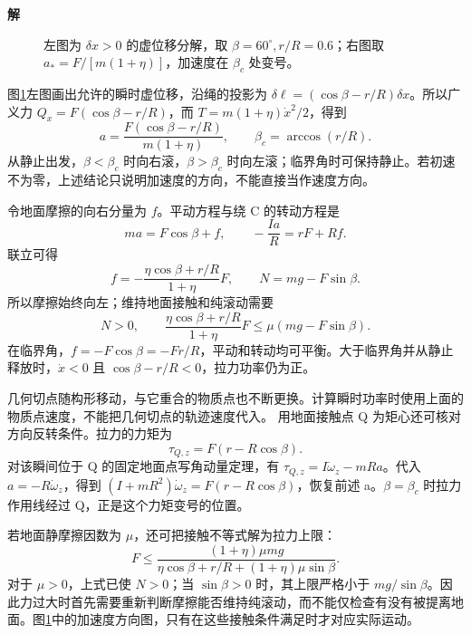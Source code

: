 \documentclass[11pt,openany,fontset=fandol]{ctexbook}
\theoremstyle{definition}\newtheorem{example}{例}[chapter]\newtheorem{exercise}{习题}[chapter]
\newcommand{\SolutionStart}{\par\medskip\ifdim\pagetotal>0pt\ifdim\dimexpr\pagegoal-\pagetotal\relax<3\baselineskip\newpage\fi\fi\noindent\textbf{解}\quad\ignorespaces}
\newenvironment{solution}{\SolutionStart}{\par\medskip}
\begin{document}
\begin{solution}
\begin{figure}[H]
\caption{左图为 $\delta x>0$ 的虚位移分解，取 $\beta=60^\circ,r/R=0.6$；右图取 $a_*=F/[m(1+\eta)]$，加速度在 $\beta_c$ 处变号。}\label{mp5:fig:l5-h12-s}
\end{figure}

图\ref{mp5:fig:l5-h12-s}左图画出允许的瞬时虚位移，沿绳的投影为 $\delta\ell=(\cos\beta-r/R)\delta x$。所以广义力 $Q_x=F(\cos\beta-r/R)$，而 $T=m(1+\eta)\dot x^2/2$，得到
\[
\boxed{a=\frac{F(\cos\beta-r/R)}{m(1+\eta)},\qquad
\beta_c=\arccos(r/R).}
\]
从静止出发，$\beta<\beta_c$ 时向右滚，$\beta>\beta_c$ 时向左滚；临界角时可保持静止。若初速不为零，上述结论只说明加速度的方向，不能直接当作速度方向。

令地面摩擦的向右分量为 $f$。平动方程与绕 C 的转动方程是
\[
ma=F\cos\beta+f,\qquad
-\frac{Ia}R=rF+Rf.
\]
联立可得
\[
f=-\frac{\eta\cos\beta+r/R}{1+\eta}F,\qquad
N=mg-F\sin\beta.
\]
所以摩擦始终向左；维持地面接触和纯滚动需要
\[
\boxed{N>0,\qquad
\frac{\eta\cos\beta+r/R}{1+\eta}F\le\mu(mg-F\sin\beta).}
\]
在临界角，$f=-F\cos\beta=-Fr/R$，平动和转动均可平衡。大于临界角并从静止释放时，$\dot x<0$ 且 $\cos\beta-r/R<0$，拉力功率仍为正。

几何切点随构形移动，与它重合的物质点也不断更换。计算瞬时功率时使用上面的物质点速度，不能把几何切点的轨迹速度代入。
用地面接触点 Q 为矩心还可核对方向反转条件。拉力的力矩为
\[
\tau_{Q,z}=F(r-R\cos\beta).
\]
对该瞬间位于 Q 的固定地面点写角动量定理，有 $\tau_{Q,z}=I\dot\omega_z-mRa$。代入 $a=-R\dot\omega_z$，得到 $(I+mR^2)\dot\omega_z=F(r-R\cos\beta)$，恢复前述 a。$\beta=\beta_c$ 时拉力作用线经过 Q，正是这个力矩变号的位置。

若地面静摩擦因数为 $\mu$，还可把接触不等式解为拉力上限：
\[
F\le\frac{(1+\eta)\mu mg}
{\eta\cos\beta+r/R+(1+\eta)\mu\sin\beta}.
\]
对于 $\mu>0$，上式已使 $N>0$；当 $\sin\beta>0$ 时，其上限严格小于 $mg/\sin\beta$。因此力过大时首先需要重新判断摩擦能否维持纯滚动，而不能仅检查有没有被提离地面。图\ref{mp5:fig:l5-h12-s}中的加速度方向图，只有在这些接触条件满足时才对应实际运动。

\end{solution}
\end{document}
